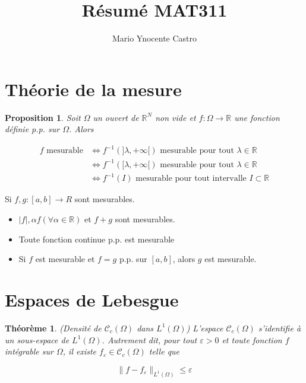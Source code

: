 \documentclass[10pt,a4paper,oneside]{article}
\newtheorem{theoreme}{Théorème}
\newtheorem{proposition}{Proposition}
\begin{document}
\title{Résumé MAT311}
\author{Mario Ynocente Castro}

\maketitle

\section{Théorie de la mesure}

\begin{proposition}
Soit $\Omega$ un ouvert de $\mathbb{R}^N$ non vide et $f : \Omega \to \mathbb{R}$ une fonction définie p.p. sur $\Omega$. Alors

\begin{align*}
f\text{ mesurable} &\Leftrightarrow f^{-1}(]\lambda,+\infty[) \text{ mesurable pour tout } \lambda \in \mathbb{R}\\
&\Leftrightarrow f^{-1}([\lambda,+\infty[) \text{ mesurable pour tout } \lambda \in \mathbb{R}\\
&\Leftrightarrow f^{-1}(I) \text{ mesurable pour tout intervalle } I \subset \mathbb{R}
\end{align*}

\end{proposition}

Si $f,g : [a,b] \to R$ sont mesurables.

\begin{itemize}
\item
 $|f|, \alpha f(\forall \alpha \in \mathbb{R})$ et $f + g$ sont mesurables.
\item
Toute fonction continue p.p. est mesurable
\item
Si $f$ est mesurable et $f = g$ p.p. sur $[a,b]$, alors $g$ est mesurable.
\end{itemize}

\section{Espaces de Lebesgue}

\begin{theoreme}
(Densité de $\mathcal{C}_c(\Omega)$ dans $L^1(\Omega)$)
L'espace $\mathcal{C}_c(\Omega)$ s'identifie à un sous-espace de $L^1(\Omega)$. Autrement dit, pour tout $\varepsilon > 0$ et toute fonction $f$ intégrable sur $\Omega$, il existe $f_\varepsilon \in \mathcal{C}_c(\Omega)$ telle que

\[ \| f - f_\varepsilon \|_{L^1(\Omega)} \leq \varepsilon \]
\end{theoreme}
\end{document}
